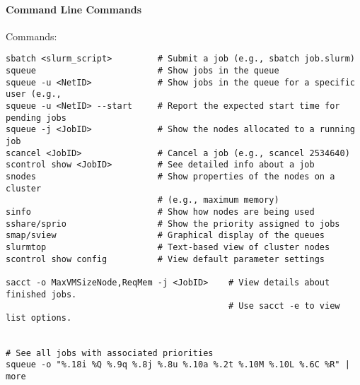 \documentclass[12pt]{article}
\theoremstyle{plain}
\theoremstyle{definition}
\theoremstyle{remark}
\begin{document}
\paragraph{Command Line Commands}
Commands:
\lstset{style=bash}
\begin{lstlisting}
sbatch <slurm_script>         # Submit a job (e.g., sbatch job.slurm)
squeue                        # Show jobs in the queue
squeue -u <NetID>             # Show jobs in the queue for a specific user (e.g.,
squeue -u <NetID> --start     # Report the expected start time for pending jobs
squeue -j <JobID>             # Show the nodes allocated to a running job
scancel <JobID>               # Cancel a job (e.g., scancel 2534640)
scontrol show <JobID>         # See detailed info about a job
snodes                        # Show properties of the nodes on a cluster
                              # (e.g., maximum memory)
sinfo                         # Show how nodes are being used
sshare/sprio                  # Show the priority assigned to jobs
smap/sview                    # Graphical display of the queues
slurmtop                      # Text-based view of cluster nodes
scontrol show config          # View default parameter settings

sacct -o MaxVMSizeNode,ReqMem -j <JobID>    # View details about finished jobs.
                                            # Use sacct -e to view list options.


# See all jobs with associated priorities
squeue -o "%.18i %Q %.9q %.8j %.8u %.10a %.2t %.10M %.10L %.6C %R" | more

\end{lstlisting}
\end{document}
